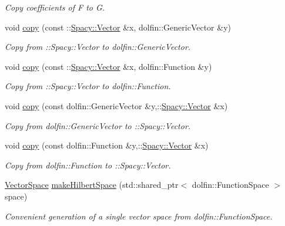 \begin{DoxyCompactItemize}
\begin{DoxyCompactList}\small\item\em \-Copy coefficients of \-F to \-G. \end{DoxyCompactList}\item 
void \hyperlink{group__FenicsGroup_ga7f43f0c660d0646adb031b453c536bb0}{copy} (const \-::\hyperlink{classSpacy_1_1Vector}{\-Spacy\-::\-Vector} \&x, dolfin\-::\-Generic\-Vector \&y)
\begin{DoxyCompactList}\small\item\em \-Copy from \-:\-:\-Spacy\-:\-:\-Vector to dolfin\-::\-Generic\-Vector. \end{DoxyCompactList}\item 
void \hyperlink{group__FenicsGroup_ga28fb1ebae29e07ec0256bb2331599aa7}{copy} (const \-::\hyperlink{classSpacy_1_1Vector}{\-Spacy\-::\-Vector} \&x, dolfin\-::\-Function \&y)
\begin{DoxyCompactList}\small\item\em \-Copy from \-:\-:\-Spacy\-:\-:\-Vector to dolfin\-::\-Function. \end{DoxyCompactList}\item 
void \hyperlink{group__FenicsGroup_ga61c5e45dbb789c155fbf86f8ec288f17}{copy} (const dolfin\-::\-Generic\-Vector \&y,\-::\hyperlink{classSpacy_1_1Vector}{\-Spacy\-::\-Vector} \&x)
\begin{DoxyCompactList}\small\item\em \-Copy from dolfin\-::\-Generic\-Vector to \-:\-:\-Spacy\-:\-:\-Vector. \end{DoxyCompactList}\item 
void \hyperlink{namespaceSpacy_1_1FEniCS_a7c4519bd0cbdc4e72b71f273bade591e}{copy} (const dolfin\-::\-Function \&y,\-::\hyperlink{classSpacy_1_1Vector}{\-Spacy\-::\-Vector} \&x)
\begin{DoxyCompactList}\small\item\em \-Copy from dolfin\-::\-Function to \-:\-:\-Spacy\-:\-:\-Vector. \end{DoxyCompactList}\item 
\hyperlink{classSpacy_1_1VectorSpace}{\-Vector\-Space} \hyperlink{group__FenicsGroup_ga8b67cb3d0188d2398625595b79e2fa6a}{make\-Hilbert\-Space} (std\-::shared\-\_\-ptr$<$ dolfin\-::\-Function\-Space $>$ space)
\begin{DoxyCompactList}\small\item\em \-Convenient generation of a single vector space from dolfin\-::\-Function\-Space. \end{DoxyCompactList}\item 

\end{DoxyCompactItemize}
